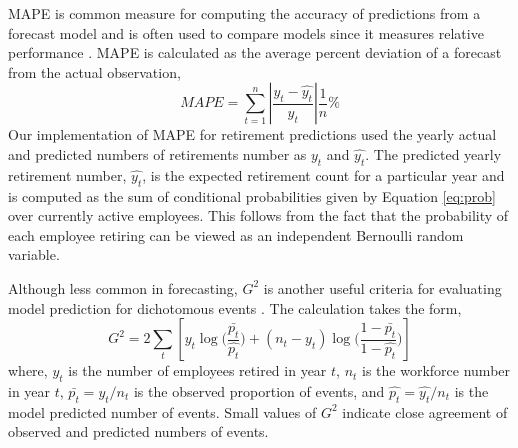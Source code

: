 \documentclass[12pt,letterpaper]{article}
\begin{document}
MAPE is common measure for computing the accuracy of predictions from a forecast model and is often used to compare models since it measures relative performance \citep{chu1998}. MAPE is calculated as the average percent deviation of a forecast from the actual observation,
\begin{equation}
\label{eq:mape}
MAPE=\sum_{t=1}^{n}\left | \frac{y_t-\hat{y_t}}{y_t} \right |\frac{1}{n}\%
\end{equation}
Our implementation of MAPE for retirement predictions used the yearly actual and predicted numbers of retirements number as $y_t$ and $\hat{y_t}$. The predicted yearly retirement number, $\hat{y_t}$,  is the expected retirement count for a particular year and is computed as the sum of conditional probabilities given by Equation \ref{eq:prob} over currently active employees.  This follows from the fact that the probability of each employee retiring can be viewed as an independent Bernoulli random variable.


Although less common in forecasting, $G^2$ is another useful criteria for evaluating model prediction for dichotomous events \citep{Simonoff2013}. The calculation takes the form,
\begin{equation}
\label{eq:g2}
G^2=2\sum_{t}[y_t\log{(\frac{\bar{p_t}}{\hat{p_t}}})+ (n_t-y_t)\log{(\frac{1-\bar{p_t}}{1-\hat{p_t}}})]
\end{equation}
where, $y_t$ is the number of employees retired in year $t$, $n_t$ is the workforce number in year $t$, $\bar{p_t}={y_t}/{n_t}$ is the observed proportion of events, and $\hat{p_t}={\hat{y_t}}/{n_t} $ is the model predicted number of events.  Small values of $G^2$ indicate close agreement of observed and predicted numbers of events.



\end{document}
